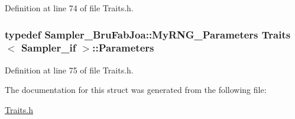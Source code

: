 Definition at line 74 of file Traits.\-h.

\hypertarget{struct_traits_3_01_sampler__if_01_4_a3e3228ca7fdd226d0a78be29ba406660}{
\subsubsection[{Parameters}]{\setlength{\rightskip}{0pt plus 5cm}typedef {\bf Sampler\-\_\-\-Bru\-Fab\-Joa\-::\-My\-R\-N\-G\-\_\-\-Parameters} {\bf Traits}$<$ {\bf Sampler\-\_\-if} $>$\-::{\bf Parameters}}}\label{struct_traits_3_01_sampler__if_01_4_a3e3228ca7fdd226d0a78be29ba406660}


Definition at line 75 of file Traits.\-h.



The documentation for this struct was generated from the following file\-:\begin{DoxyCompactItemize}
\item 
\hyperlink{_traits_8h}{Traits.\-h}\end{DoxyCompactItemize}
